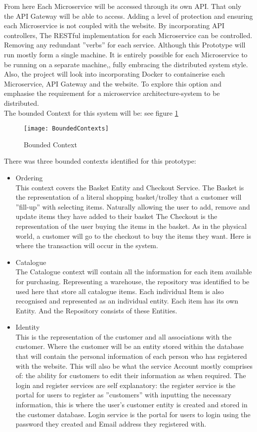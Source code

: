 From here Each Microservice will be accessed through its own API. That only the API Gateway will be able to access. Adding a level of protection and ensuring each Microservice is not coupled with the website. By incorporating API controllers, The RESTful implementation for each Microservice can be controlled. Removing any redundant ''verbs'' for each service. 
Although this Prototype will run mostly form a single machine. It is entirely possible for each Microservice to be running on a separate machine,, fully embracing the distributed system style. Also, the project will look into incorporating Docker to containerise each Microservice, API Gateway and the website. To explore this option and emphasise the requirement for a microservice architecture-system to be distributed.
\\
The bounded Context for this system will be: see figure \ref{fig:BoundedContext}
	\begin{figure}[h]
		\caption{Bounded Context}
		\label{fig:BoundedContext}
		\texttt{[image: BoundedContexts]}
	\end{figure}
There was three bounded contexts identified for this prototype:
\begin{itemize}
	\item Ordering\\
	This context covers the Basket Entity and Checkout Service. The Basket is the representation of a literal shopping basket/trolley that a customer will ''fill-up'' with selecting items. Naturally allowing the user to add, remove and update items they have added to their basket
	The Checkout is the representation of the user buying the items in the basket. As in the physical world, a customer will go to the checkout to buy the items they want. Here is where the transaction will occur in the system.
	\item Catalogue\\
	The Catalogue context will contain all the information for each item available for purchasing. Representing a warehouse, the repository was identified to be used here that store all catalogue items. Each individual Item is also recognised and represented as an individual entity. Each item has its own Entity. And the Repository consists of these Entities.
	\item Identity\\
	This is the representation of the customer and all associations with the customer. Where the customer will be an entity stored within the database that will contain the personal information of each person who has registered with the website. This will also be what the service Account mostly comprises of: the ability for customers to edit their information as when required. The login and register services are self explanatory: the register service is the portal for users to register as ''customers'' with inputting the necessary information, this is where the user's customer entity is created and stored in the customer database. Login service is the portal for users to login using the password they created and Email address they registered with.
\end{itemize}

